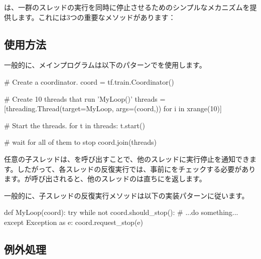 \begin{content}

は、一群のスレッドの実行を同時に停止させるためのシンプルなメカニズムを提供します。これには3つの重要なメソッドがあります：

\begin{enum}
\end{enum}

\subsection{使用方法}

一般的に、メインプログラムは以下のパターンでを使用します。

\begin{leftbar}
\begin{python}
# Create a coordinator.
coord = tf.train.Coordinator()

# Create 10 threads that run 'MyLoop()'
threads = [threading.Thread(target=MyLoop, args=(coord,)) 
          for i in xrange(10)]

# Start the threads.
for t in threads:
  t.start()
  
# wait for all of them to stop
coord.join(threads)
\end{python}
\end{leftbar}

任意の子スレッドは、を呼び出すことで、他のスレッドに実行停止を通知できます。したがって、各スレッドの反復実行では、事前にをチェックする必要があります。が呼び出されると、他のスレッドのは直ちにを返します。

一般的に、子スレッドの反復実行メソッドは以下の実装パターンに従います。


\begin{leftbar}
\begin{python}
def MyLoop(coord):
  try
    while not coord.should_stop():
      # ...do something...
  except Exception as e:
    coord.request_stop(e)
\end{python}
\end{leftbar}

\subsection{例外処理}


\end{content}
